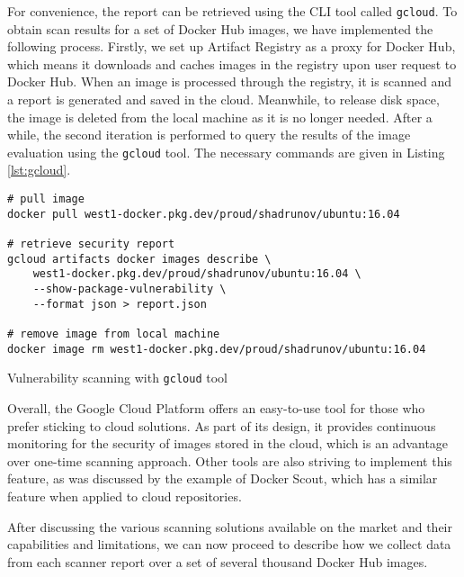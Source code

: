 For convenience, the report can be retrieved using the CLI tool called \texttt{gcloud}. To obtain scan results for a set of Docker Hub images, we have implemented the following process. Firstly, we set up Artifact Registry as a proxy for Docker Hub, which means it downloads and caches images in the registry upon user request to Docker Hub. When an image is processed through the registry, it is scanned and a report is generated and saved in the cloud. Meanwhile, to release disk space, the image is deleted from the local machine as it is no longer needed. After a while, the second iteration is performed to query the results of the image evaluation using the \texttt{gcloud} tool. The necessary commands are given in Listing \ref{lst:gcloud}.

\begin{listing}[htp]
    \centering
    \begin{minipage}{0.85\linewidth}
        \begin{verbatim}
# pull image
docker pull west1-docker.pkg.dev/proud/shadrunov/ubuntu:16.04

# retrieve security report
gcloud artifacts docker images describe \
    west1-docker.pkg.dev/proud/shadrunov/ubuntu:16.04 \
    --show-package-vulnerability \
    --format json > report.json

# remove image from local machine
docker image rm west1-docker.pkg.dev/proud/shadrunov/ubuntu:16.04
        \end{verbatim}
    \end{minipage}
    \caption{Vulnerability scanning with \texttt{gcloud} tool}
    \label{lst:gcloud}
\end{listing}

Overall, the Google Cloud Platform offers an easy-to-use tool for those who prefer sticking to cloud solutions. As part of its design, it provides continuous monitoring for the security of images stored in the cloud, which is an advantage over one-time scanning approach. Other tools are also striving to implement this feature, as was discussed by the example of Docker Scout, which has a similar feature when applied to cloud repositories.

After discussing the various scanning solutions available on the market and their capabilities and limitations, we can now proceed to describe how we collect data from each scanner report over a set of several thousand Docker Hub images.


\clearpage

